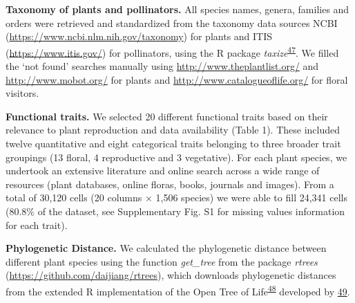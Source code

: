 \documentclass[12pt,a4paper,]{article}
\begin{document}
\textbf{Taxonomy of plants and pollinators.} All species names, genera,
families and orders were retrieved and standardized from the taxonomy
data sources NCBI (\url{https://www.ncbi.nlm.nih.gov/taxonomy}) for
plants and ITIS (\url{https://www.itis.gov/}) for pollinators, using the
R package
\emph{taxize}\textsuperscript{\protect\hyperlink{ref-chamberlain2020}{47}}.
We filled the `not found' searches manually using
\url{http://www.theplantlist.org/} and \url{http://www.mobot.org/} for
plants and \url{http://www.catalogueoflife.org/} for floral visitors.

\textbf{Functional traits.} We selected 20 different functional traits
based on their relevance to plant reproduction and data availability
(Table 1). These included twelve quantitative and eight categorical
traits belonging to three broader trait groupings (13 floral, 4
reproductive and 3 vegetative). For each plant species, we undertook an
extensive literature and online search across a wide range of resources
(plant databases, online floras, books, journals and images). From a
total of 30,120 cells (20 columns × 1,506 species) we were able to fill
24,341 cells (80.8\% of the dataset, see Supplementary Fig. S1 for
missing values information for each trait).

\textbf{Phylogenetic Distance.} We calculated the phylogenetic distance
between different plant species using the function \emph{get\_tree} from
the package \emph{rtrees} (\url{https://github.com/daijiang/rtrees}),
which downloads phylogenetic distances from the extended R
implementation of the Open Tree of
Life\textsuperscript{\protect\hyperlink{ref-smith2018}{48}} developed by
\protect\hyperlink{ref-jin2019}{49}.

\singlespacing

\begingroup\fontsize{10}{12}\selectfont
\end{document}
